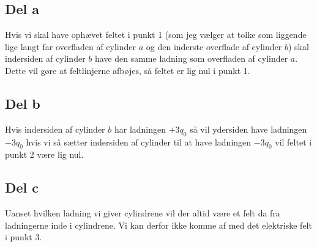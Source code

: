 \subsection{Del a} %
\label{sub:del_a}
Hvis vi skal have ophævet feltet i punkt 1 (som jeg vælger at tolke som liggende lige langt far overfladen af cylinder $a$ og den inderste overflade af cylinder $b$) skal indersiden af cylinder $b$ have den samme ladning som overfladen af cylinder $a$. Dette vil gøre at feltlinjerne afbøjes, så feltet er lig nul i punkt 1. 

\subsection{Del b} %
\label{sub:del_b}
Hvis indersiden af cylinder $b$ har ladningen $+3q_0$ så vil ydersiden have ladningen $-3q_0$ hvis vi så sætter indersiden af cylinder til at have ladningen $-3q_0$ vil feltet i punkt 2 være lig nul.

\subsection{Del c} %
\label{sub:del_c}
Uanset hvilken ladning vi giver cylindrene vil der altid være et felt da fra ladningerne inde i cylindrene. Vi kan derfor ikke komme af med det elektriske felt i punkt 3.
